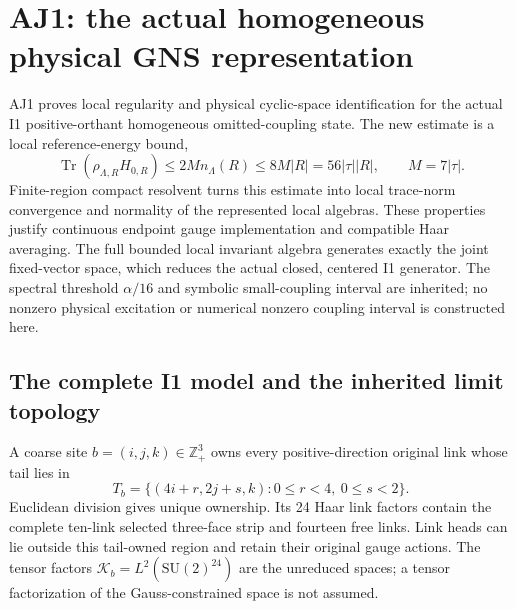 \section{AJ1: the actual homogeneous physical GNS representation\workstar}
\label{sec:aj1}
AJ1 proves local regularity and physical cyclic-space identification for the actual I1 positive-orthant homogeneous omitted-coupling state. The new estimate is a local reference-energy bound,
\begin{equation}
 \operatorname{Tr}(\rho_{\Lambda,R}H_{0,R})
 \le2M n_\Lambda(R)\le8M|R|=56|\tau||R|,
 \qquad M=7|\tau|.
 \label{eq:aj1-energy}
\end{equation}
Finite-region compact resolvent turns this estimate into local trace-norm convergence and normality of the represented local algebras. These properties justify continuous endpoint gauge implementation and compatible Haar averaging. The full bounded local invariant algebra generates exactly the joint fixed-vector space, which reduces the actual closed, centered I1 generator. The spectral threshold $\alpha/16$ and symbolic small-coupling interval are inherited; no nonzero physical excitation or numerical nonzero coupling interval is constructed here.

\subsection{The complete I1 model and the inherited limit topology}
A coarse site $b=(i,j,k)\in\mathbb Z_+^3$ owns every positive-direction original link whose tail lies in
\begin{equation}
 T_b=\{(4i+r,2j+s,k):0\le r<4,\ 0\le s<2\}.
\end{equation}
Euclidean division gives unique ownership. Its 24 Haar link factors contain the complete ten-link selected three-face strip and fourteen free links. Link heads can lie outside this tail-owned region and retain their original gauge actions. The tensor factors $\mathcal K_b=L^2(\mathrm{SU}(2)^{24})$ are the unreduced spaces; a tensor factorization of the Gauss-constrained space is not assumed.

